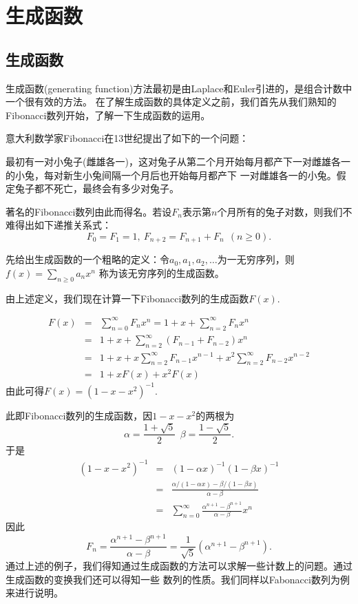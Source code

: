 \documentclass[a4paper,11pt,twoside]{book}
\begin{document}
\chapter{生成函数}
\label{chap1}

\section{生成函数}
生成函数(generating function)方法最初是由Laplace和Euler引进的，是组合计数中一个很有效的方法。
在了解生成函数的具体定义之前，我们首先从我们熟知的Fibonacci数列开始，了解一下生成函数的运用。

意大利数学家Fibonacci在13世纪提出了如下的一个问题：

最初有一对小兔子(雌雄各一)，这对兔子从第二个月开始每月都产下一对雌雄各一的小兔，每对新生小兔间隔一个月后也开始每月都产下
一对雌雄各一的小兔。假定兔子都不死亡，最终会有多少对兔子。

著名的Fibonacci数列由此而得名。若设$F_n$表示第$n$个月所有的兔子对数，则我们不难得出如下递推关系式：
$$F_0=F_1=1,\ F_{n+2}=F_{n+1}+F_n\ \ (n\geq 0).$$

先给出生成函数的一个粗略的定义：令$a_0,a_1,a_2,\ldots$为一无穷序列，则
$f(x)=\sum_{n\geq0}a_nx^n$
称为该无穷序列的生成函数。


由上述定义，我们现在计算一下Fibonacci数列的生成函数$F(x).$

\begin{eqnarray*}
F(x)&=&\sum_{n=0}^{\infty}F_nx^n=1+x+\sum_{n=2}^{\infty}F_nx^n\\
&=&1+x+\sum_{n=2}^{\infty}(F_{n-1}+F_{n-2})x^n\\
&=&1+x+x\sum_{n=2}^{\infty}F_{n-1}x^{n-1}+x^2\sum_{n=2}^{\infty}F_{n-2}x^{n-2}\\
&=&1+xF(x)+x^2F(x)
\end{eqnarray*}
由此可得$F(x)=(1-x-x^2)^{-1}.$

此即Fibonacci数列的生成函数，因$1-x-x^2$的两根为
$$\alpha=\frac{1+\sqrt{5}}{2}\ \ \beta=\frac{1-\sqrt{5}}{2}.$$
于是
\begin{eqnarray*}
(1-x-x^2)^{-1}&=&(1-\alpha x)^{-1}(1-\beta x)^{-1}\\
&=&\frac{\alpha/(1-\alpha x)-\beta/(1-\beta x)}{\alpha-\beta}\\
&=&\sum_{n=0}^{\infty}\frac{\alpha^{n+1}-\beta^{n+1}}{\alpha-\beta}x^n
\end{eqnarray*}
因此
\begin{equation}
F_n=\frac{\alpha^{n+1}-\beta^{n+1}}{\alpha-\beta}=\frac{1}{\sqrt{5}}(\alpha^{n+1}-\beta^{n+1}).
\end{equation}
通过上述的例子，我们得知通过生成函数的方法可以求解一些计数上的问题。通过生成函数的变换我们还可以得知一些
数列的性质。我们同样以Fabonacci数列为例来进行说明。
\end{document}
